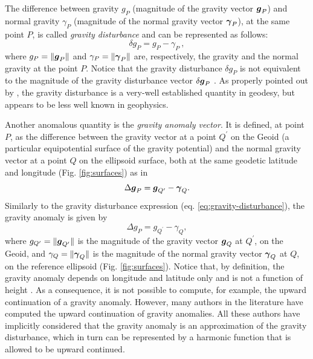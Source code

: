 \documentclass[extra]{gji}
\begin{document}
The difference between gravity $g_{P}$ (magnitude of the gravity
vector $\mitbf{g}_{P}$) and normal gravity $\gamma_{P}$
(magnitude of the normal gravity vector $\mitbf{\gamma}_{P}$), at the
same point $P$, is called \textit{gravity disturbance}
\citep{heiskanen-moritz1967, hofmann-wellenhof-moritz2005}
and can be represented as follows:
\begin{equation}
\delta g_{P} = g_{P} - \gamma_{P} \: ,
\label{eq:gravity-disturbance}
\end{equation}
where $g_{P} = \| \mitbf{g}_{P} \|$ and
$\gamma_{P} = \| \mitbf{\gamma}_{P} \|$ are,
respectively, the gravity and the normal gravity at the
point $P$.
Notice that the gravity disturbance $\delta g_{P}$ is not equivalent
to the magnitude of the gravity disturbance vector
$\delta \mitbf{g}_{P}$ \citep{barthelmes2013, sanso_sideris2013}.
As properly pointed out by \citet{hackney-featherstone2003},
the gravity disturbance is a very-well established quantity in geodesy,
but appears to be less well known in geophysics.

Another anomalous quantity is the \textit{gravity anomaly vector}.
It is defined, at point $P$, as the difference between the gravity
vector at a point $Q^{\prime}$ on the Geoid (a particular
equipotential surface of the gravity potential) and the normal
gravity vector at a point $Q$ on the ellipsoid surface, both at the
same geodetic latitude and longitude (Fig. \ref{fig:surfaces}) as in
\begin{equation}
\Delta \mitbf{g}_{P} = \mitbf{g}_{Q^{\prime}} - \mitbf{\gamma}_{Q} .
\label{eq:gravity-anomaly-vector}
\end{equation}
Similarly to the gravity disturbance expression (eq.
\ref{eq:gravity-disturbance}), the gravity anomaly is given by
\begin{equation}
\Delta g_{P} = g_{Q^{\prime}} - \gamma_{Q} ,
\label{eq:gravity-anomaly}
\end{equation}
where $g_{Q^{\prime} } = \| \mitbf{g}_{Q^{\prime}} \|$ is
the magnitude of the gravity vector $\mitbf{g}_{Q}$ at $Q^{\prime}$,
on the Geoid, and $\gamma_{Q} = \| \mitbf{\gamma}_{Q} \|$ is the
magnitude of the normal gravity vector $\mitbf{\gamma}_{Q}$ at $Q$,
on the reference ellipsoid (Fig. \ref{fig:surfaces}).
Notice that, by definition, the gravity anomaly depends on
longitude and latitude only and is not a function of height
\citep{barthelmes2013}. As a consequence, it is not possible to compute,
for example, the upward continuation of a gravity anomaly.
However, many authors in the literature have computed the upward
continuation of gravity anomalies. All these authors have
implicitly considered that the gravity anomaly is an approximation of
the gravity disturbance, which in turn can be represented by a
harmonic function that is allowed to be upward continued.
\end{document}
